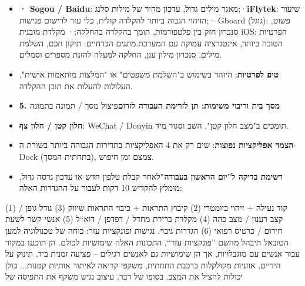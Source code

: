 
\begin{itemize}
  \item \textbf{· Sogou / Baidu}: מאגר מילים גדול, עדכון מהיר של מילות סלנג;\newline ·\textbf{iFlytek}: שיעור הזיהוי הגבוה ביותר להקלדה קולית, כלי עזר לרישום פגישות;\newline · Gboard (גוגל): פשוט, סנכרון חזק בין פלטפורמות, תומך בהקלדה בהחלקה;\newline · מקלדת מובנית iOS: הפרטיות הטובה ביותר, אינטגרציה עמוקה עם המערכת.\newline מתגים הכרחיים\newline : תיקון חכם, השלמת מילים, סנכרון מילון ענן, החלקה למעלה להזנת מספרים וסמלים.
  \item \textbf{טיפ לפרטיות}: היזהר בשימוש ב"השלמת משפטים" או "המלצות מותאמות אישית", העלולות להעלות את תוכן ההקלדה.
  \item \textbf{5. מסך בית וריבוי משימות: תן לזרימת העבודה לזרום}פיצול מסך / תמונה בתמונה
\end{itemize}


\begin{itemize}
  \item \textbf{חלון קטן / חלון צף}: WeChat / Douyin תומכים ב"מצב חלון קטן", השב וסגור מיד.
  \item \textbf{הצמד אפליקציות נפוצות}: שים רק את 4 האפליקציות בתדירות הגבוהה ביותר בשורת ה-Dock (בתחתית המסך), צמצם זמן חיפוש.
  \item \textbf{רשימת בדיקה ל"יום הראשון בעבודה"}לאחר קבלת טלפון חדש או עדכון גרסה גדול, מומלץ להקדיש 10 דקות לעבור על ההגדרות האלה:
\end{itemize}

\begin{tcbinfo}{(1) קוד נעילה + זיהוי ביומטרי (2) קיבוץ התראות + כיבוי התראות שיווק (3) גודל גופן / קצב רענון / מצב כהה}
(4) מקלדת ברירת מחדל / דפדפן / דוא“ל (5) אנשי קשר לשעת חירום / כרטיס רפואי (6) הגדרות גיבוי. נגישות ופונקציות עזר: כוחה של טכנולוגיה למען הטוב\newline אל תיבהל מהשם ”פונקציות עזר“, התכונות האלה שימושיות לכולם. הן תוכננו במקור עבור אנשים עם מוגבלויות, אך הן שימושיות גם לאנשים רגילים – פציעה זמנית ביד, תינוק על הידיים, אוזניות מקולקלות ברכבת התחתית, משקפי קריאה לאיתור אותיות קטנות... כולן יכולות להציל את המצב. בסופו של דבר, עיצוב נגיש משקף את התפיסה של

\end{tcbinfo}

